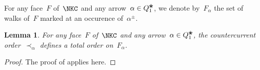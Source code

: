 \documentclass{amsart}
\newtheorem{lemma}[theorem]{Lemma}
\theoremstyle{definition}
\newcommand{\blossom}{^\text{\ding{96}}} %
\begin{document}

For any face~$F$ of~$\NKC$ and any arrow~$\alpha\in Q_1\blossom$, we denote by~$F_\alpha$ the set of walks of~$F$ marked at an occurence of~$\alpha^\pm$.

\begin{lemma}
\label{lemm:countercurrentOrderIsTotal}
For any face~$F$ of~$\NKC$ and any arrow~$\alpha\in Q_1\blossom$, the countercurrent order~$\prec_\alpha$ defines a total order on~$F_{\alpha}$.
\end{lemma}
\begin{proof}
 The proof of \cite[Lemma 2.21]{PaluPilaudPlamondon} applies here.
\end{proof}
\end{document}
